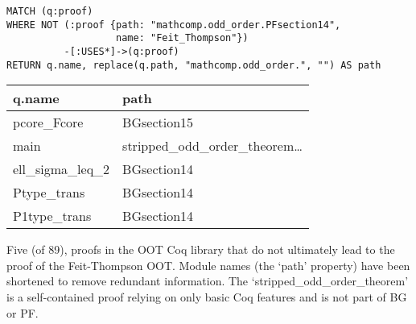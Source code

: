 \begin{verbatim}
MATCH (q:proof) 
WHERE NOT (:proof {path: "mathcomp.odd_order.PFsection14",
                   name: "Feit_Thompson"})
          -[:USES*]->(q:proof)
RETURN q.name, replace(q.path, "mathcomp.odd_order.", "") AS path
\end{verbatim}

\centering

\begin{tabular*}{\textwidth}{@{\extracolsep{\fill}} ll}

  \toprule

	\textbf{q.name}	& \textbf{path} \\

	\midrule

	pcore\_Fcore     & BGsection15 \\
	main            & stripped\_odd\_order\_theorem\ldots\\
	ell\_sigma\_leq\_2 & BGsection14 \\
	Ptype\_trans     & BGsection14 \\
	P1type\_trans    & BGsection14 \\

  \bottomrule

\end{tabular*}

\bigskip

\caption{Five (of 89), proofs in the OOT Coq library that do not ultimately
  lead to the proof of the Feit-Thompson OOT. Module names (the `path'
  property) have been shortened to remove redundant information. The
  `stripped\_odd\_order\_theorem' is a self-contained proof relying on only
  basic Coq features and is not part of BG or PF.}\label{table:oot:leadto}
